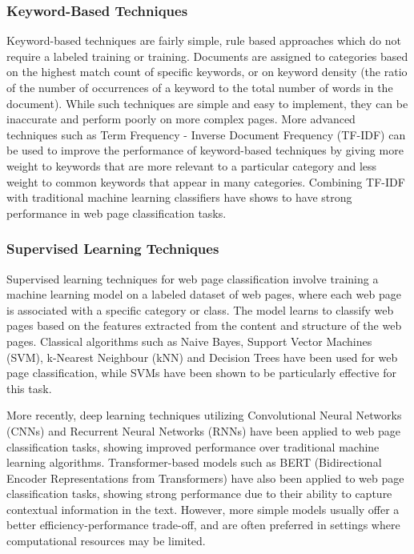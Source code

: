 \subsubsection{Keyword-Based Techniques}\label{subsubsec:keyword-based-techniques}
Keyword-based techniques are fairly simple, rule based approaches which do not require a labeled training or training.
Documents are assigned to categories based on the highest match count of specific keywords, or on keyword density (the ratio of the number of occurrences of a keyword to the total number of words in the document).
While such techniques are simple and easy to implement, they can be inaccurate and perform poorly on more complex pages\cite{Procycons_2025}.
More advanced techniques such as Term Frequency - Inverse Document Frequency (TF-IDF) can be used to improve the performance of keyword-based techniques by giving more weight to keywords that are more relevant to a particular category and less weight to common keywords that appear in many categories.
Combining TF-IDF with traditional machine learning classifiers have shows to have strong performance in web page classification tasks\cite{de2019towards}.

\subsubsection{Supervised Learning Techniques}\label{subsubsec:supervised-learning-techniques}
Supervised learning techniques for web page classification involve training a machine learning model on a labeled dataset of web pages, where each web page is associated with a specific category or class.
The model learns to classify web pages based on the features extracted from the content and structure of the web pages.
Classical algorithms such as Naive Bayes, Support Vector Machines (SVM), k-Nearest Neighbour (kNN) and Decision Trees have been used for web page classification, while SVMs have been shown to be particularly effective for this task\cite{petprasit2015commerce}.

More recently, deep learning techniques utilizing Convolutional Neural Networks (CNNs) and Recurrent Neural Networks (RNNs) have been applied to web page classification tasks, showing improved performance over traditional machine learning algorithms.
Transformer-based models such as BERT (Bidirectional Encoder Representations from Transformers) have also been applied to web page classification tasks, showing strong performance due to their ability to capture contextual information in the text.
However, more simple models usually offer a better efficiency-performance trade-off, and are often preferred in settings where computational resources may be limited\cite{mahara2025cybersecurity}.


